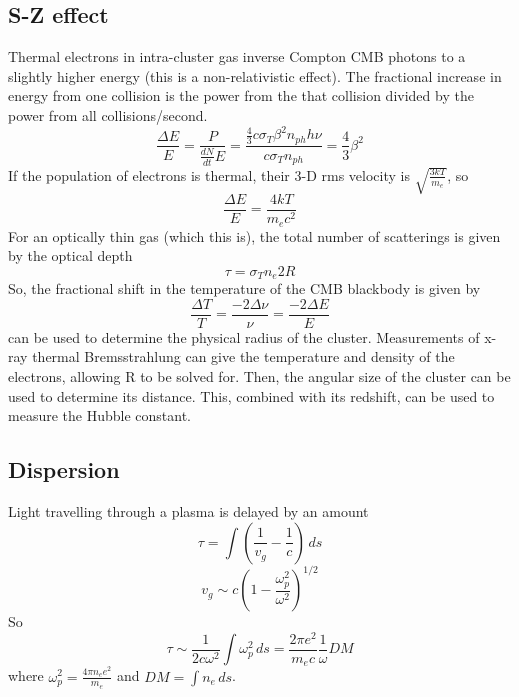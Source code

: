 \subsection{S-Z effect}
Thermal electrons in intra-cluster gas inverse Compton CMB photons to a slightly higher energy 
(this is a non-relativistic effect).  The fractional increase in energy from one collision is 
the power from the that collision divided by the power from all collisions/second.
\begin{displaymath}\frac{\Delta{E}}{E}=\frac{P}{\frac{dN}{dt}E}=\frac{\frac{4}{3}c\sigma_T\beta^2n_{ph}h\nu}{c\sigma_Tn_{ph}}=\frac{4}{3}\beta^2\end{displaymath}
If the population of electrons is thermal, their 3-D rms velocity is $\sqrt{\frac{3kT}{m_e}}$, so
\begin{displaymath}\frac{\Delta{E}}{E}=\frac{4kT}{m_ec^2}\end{displaymath}
For an optically thin gas (which this is), the total number of scatterings is given by the 
optical depth
\begin{displaymath}\tau=\sigma_Tn_e2R\end{displaymath}
So, the fractional shift in the temperature of the CMB blackbody is given by
\begin{displaymath}\frac{\Delta T}{T}=\frac{-2\Delta\nu}{\nu}=\frac{-2\Delta E}{E}\end{displaymath}
can be used to determine the physical radius of the cluster.  Measurements of x-ray thermal 
Bremsstrahlung can give the temperature and density of the electrons, allowing R to be solved for.
Then, the angular size of the cluster can be used to determine its distance.  This, combined with 
its redshift, can be used to measure the Hubble constant.

\subsection{Dispersion}
Light travelling through a plasma is delayed by an amount 
\begin{displaymath}\tau=\int\left(\frac{1}{v_g}-\frac{1}{c}\right)\,ds\end{displaymath}
\begin{displaymath}v_g\sim c\left(1-\frac{\omega_p^2}{\omega^2}\right)^{1/2}\end{displaymath}
So
\begin{displaymath}\tau\sim\frac{1}{2c\omega^2}\int\omega_p^2\,ds=\frac{2\pi e^2}{m_ec}\frac{1}{\omega}DM\end{displaymath}
where $\omega_p^2=\frac{4\pi n_ee^2}{m_e}$ and $DM=\int n_e\,ds$.


